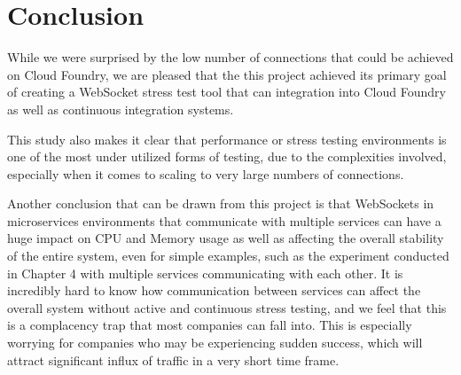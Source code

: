 \section{Conclusion}

While we were surprised by the low number of connections that could be achieved on Cloud Foundry, we are pleased that the this project achieved its primary goal of creating a WebSocket stress test tool that can integration into Cloud Foundry as well as continuous integration systems. 

This study also makes it clear that performance or stress testing environments is one of the most under utilized forms of testing, due to the complexities involved, especially when it comes to scaling to very large numbers of connections.

Another conclusion that can be drawn from this project is that WebSockets in microservices environments that communicate with multiple services can have a huge impact on CPU and Memory usage as well as affecting the overall stability of the entire system, even for simple examples, such as the experiment conducted in Chapter 4 with multiple services communicating with each other. It is incredibly hard to know how communication between services can affect the overall system without active and continuous stress testing, and we feel that this is a complacency trap that most companies can fall into. This is especially worrying for companies who may be experiencing sudden success, which will attract significant influx of traffic in a very short time frame. 